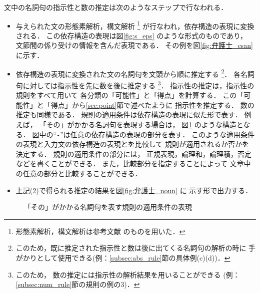 文中の名詞句の指示性と数の推定は次のようなステップで行なわれる．
\begin{itemize}
\item[(1)]
  与えられた文の形態素解析，構文解析
  \footnote{
    形態素解析，構文解析は参考文献
    \cite{Matsumoto1992,Kurohashi1992}
    のものを用いた．
    }
  が行なわれ，依存構造の表現に変換される．
  この依存構造の表現は図\ref{fig:s_eps} のような形式のものであり，
  文節間の係り受けの情報を含んだ表現である．
  その例を図\ref{fig:弁護士_csan} に示す．

\item[(2)]
  依存構造の表現に変換された文の名詞句を文頭から順に推定する
\footnote{
このため，既に推定された指示性と数は後に出てくる名詞句の解析の時に
手がかりとして使用できる(例：\ref{subsec:abs_rule}節の具体例(c)(d))．
}．
  各名詞句に対しては指示性を先に数を後に推定する
\footnote{
このため，
数の推定には指示性の解析結果を用いることができる
(例：\ref{subsec:num_rule}節の規則の例の3)．
}．
  指示性の推定は，指示性の規則をすべて用いて
  各分類の「可能性」と「得点」を計算する．
  この「可能性」と「得点」から\ref{sec:point}節で述べたように
  指示性を推定する．
  数の推定も同様である．
  規則の適用条件は依存構造の表現に似た形で表す．
  例えば，
  「その」がかかる名詞句を表現する場合は，
  図\ref{fig:その} のような構造となる．
  図中の``\verb+-+''は任意の依存構造の表現の部分を表す．
  このような適用条件の表現と入力文の依存構造の表現とを比較して
  規則が適用されるか否かを決定する．
  規則の適用条件の部分には，
  正規表現，論理和，論理積，否定などを書くことができる．
  また，比較部分を指定することによって
  文章中の任意の部分と比較することができる．

\item[(3)]
  上記(2)で得られる推定の結果を図\ref{fig:弁護士_noun} に
  示す形で出力する．
\end{itemize}

\begin{figure}[t]
\small
  \begin{center}
  \caption{「その」がかかる名詞句を表す規則の適用条件の表現}
  \label{fig:その}
  \end{center}
\end{figure}


